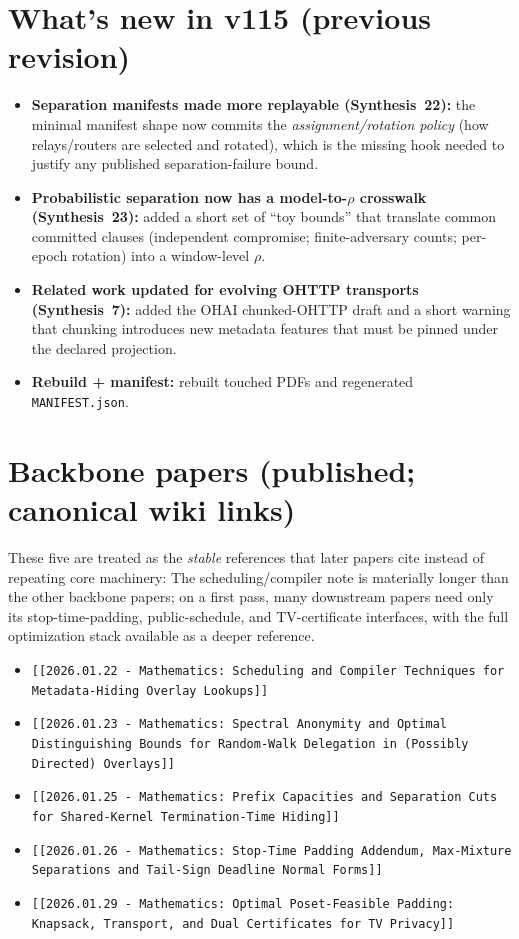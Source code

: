 \documentclass[11pt]{article}
\begin{document}
\section{What's new in v115 (previous revision)}
\begin{itemize}[leftmargin=*]
\item \textbf{Separation manifests made more replayable (Synthesis~22):} the minimal manifest shape now commits the \emph{assignment/rotation policy} (how relays/routers are selected and rotated), which is the missing hook needed to justify any published separation-failure bound.
\item \textbf{Probabilistic separation now has a model-to-$\rho$ crosswalk (Synthesis~23):} added a short set of ``toy bounds'' that translate common committed clauses (independent compromise; finite-adversary counts; per-epoch rotation) into a window-level $\rho$.
\item \textbf{Related work updated for evolving OHTTP transports (Synthesis~7):} added the OHAI chunked-OHTTP draft and a short warning that chunking introduces new metadata features that must be pinned under the declared projection.
\item \textbf{Rebuild + manifest:} rebuilt touched PDFs and regenerated \texttt{MANIFEST.json}.
\end{itemize}

\section{Backbone papers (published; canonical wiki links)}

These five are treated as the \emph{stable} references that later papers cite instead of repeating core machinery:
The scheduling/compiler note is materially longer than the other backbone papers; on a first pass, many downstream papers need only its stop-time-padding, public-schedule, and TV-certificate interfaces, with the full optimization stack available as a deeper reference.
\begin{itemize}[leftmargin=*]
\item \texttt{[[2026.01.22 - Mathematics: Scheduling and Compiler Techniques for Metadata-Hiding Overlay Lookups]]}
\item \texttt{[[2026.01.23 - Mathematics: Spectral Anonymity and Optimal Distinguishing Bounds for Random-Walk Delegation in (Possibly Directed) Overlays]]}
\item \texttt{[[2026.01.25 - Mathematics: Prefix Capacities and Separation Cuts for Shared-Kernel Termination-Time Hiding]]}
\item \texttt{[[2026.01.26 - Mathematics: Stop-Time Padding Addendum, Max-Mixture Separations and Tail-Sign Deadline Normal Forms]]}
\item \texttt{[[2026.01.29 - Mathematics: Optimal Poset-Feasible Padding: Knapsack, Transport, and Dual Certificates for TV Privacy]]}
\end{itemize}
\end{document}
